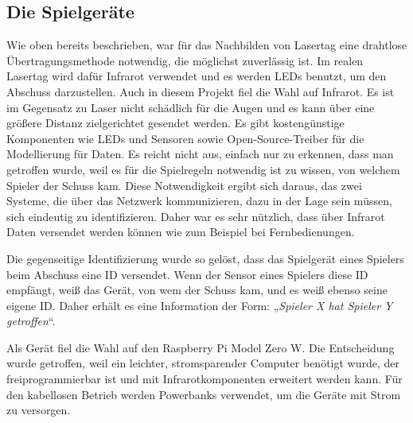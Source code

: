 \subsection{Die Spielgeräte}

Wie oben bereits beschrieben, war für das Nachbilden von Lasertag eine drahtlose Übertragungsmethode
notwendig, die möglichst zuverlässig ist.
Im realen Lasertag wird dafür Infrarot verwendet und es werden LEDs benutzt, um den Abschuss
darzustellen.
Auch in diesem Projekt fiel die Wahl auf Infrarot.
Es ist im Gegensatz zu Laser nicht schädlich für die Augen und es kann über eine größere Distanz
zielgerichtet gesendet werden.
Es gibt kostengünstige Komponenten wie LEDs und Sensoren sowie Open-Source-Treiber für die
Modellierung für Daten.
Es reicht nicht aus, einfach nur zu erkennen, dass man getroffen wurde, weil es für die Spielregeln
notwendig ist zu wissen, von welchem Spieler der Schuss kam.
Diese Notwendigkeit ergibt sich daraus, das zwei Systeme, die über das Netzwerk kommunizieren, dazu
in der Lage sein müssen, sich eindeutig zu identifizieren.
Daher war es sehr nützlich, dass über Infrarot Daten versendet werden können wie zum Beispiel bei
Fernbedienungen.

Die gegenseitige Identifizierung wurde so gelöst, dass das Spielgerät eines Spielers beim Abschuss
eine ID versendet.
Wenn der Sensor eines Spielers diese ID empfängt, weiß das Gerät, von wem der Schuss kam, und es
weiß ebenso seine eigene ID.
Daher erhält es eine Information der Form: „\emph{Spieler X hat Spieler Y getroffen}“.

Als Gerät fiel die Wahl auf den Raspberry Pi Model Zero W. Die Entscheidung wurde getroffen, weil
ein leichter, stromsparender Computer benötigt wurde, der freiprogrammierbar ist und mit
Infrarotkomponenten erweitert werden kann.
Für den kabellosen Betrieb werden Powerbanks verwendet, um die Geräte mit Strom zu versorgen.
